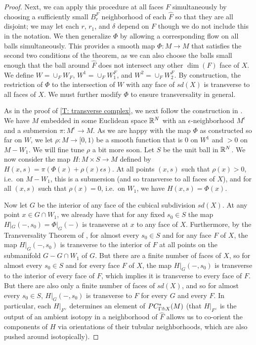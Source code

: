 \begin{proof}
	Next, we can apply this procedure at all faces $F$ simultaneously by choosing a sufficiently small $B^F_r$ neighborhood of each $\hat F$ so that they are all disjoint; we may let each $r$, $r_1$, and $\delta$ depend on $F$ though we do not include this in the notation.
	We then generalize $\Phi$ by allowing a corresponding flow on all balls simultaneously.
	This provides a smooth map $\Phi \colon M \to M$ that satisfies the second two conditions of the theorem, as we can also choose the balls small enough that the ball around $\hat F$ does not intersect any other $\dim(F)$ face of $X$.
	We define $W = \cup_F W_F$, $W^1 = \cup_F W^F_1$, and $W^2 = \cup_F W^F_2$.
	By construction, the restriction of $\Phi$ to the intersection of $W$ with any face of $sd(X)$ is transverse to all faces of $X$.
	We must further modify $\Phi$ to ensure transversality in general.

	As in the proof of \cref{T: transverse complex}, we next follow the construction in \cite[Section 2.3]{GuPo74}.
	We have $M$ embedded in some Euclidean space $\mathbb{R}^N$ with an $\epsilon$-neighborhood $M^\epsilon$ and a submersion $\pi \colon M^\epsilon \to M$.
	As we are happy with the map $\Phi$ as constructed so far on $W$, we let $\rho \colon M \to [0,1)$ be a smooth function that is $0$ on $W^1$ and $>0$ on $M-W_1$.
	We will fine tune $\rho$ a bit more soon.
	Let $S$ be the unit ball in $\mathbb{R}^N$.
	We now consider the map $H \colon M \times S \to M$ defined by $H(x,s) = \pi(\Phi(x)+\rho(x)\epsilon s)$.
	At all points $(x,s)$ such that $\rho(x)>0$, i.e.\ on $M-W_1$, this is a submersion (and so transverse to all faces of $X$), and for all $(x,s)$ such that $\rho(x) = 0$, i.e.\ on $W_1$, we have $H(x,s) = \Phi(x)$.

	Now let $G$ be the interior of any face of the cubical subdivision $sd(X)$.
	At any point $x \in G \cap W_1$, we already have that for any fixed $s_0 \in S$ the map $H|_G(-,s_0) = \Phi|_G(-)$ is transverse at $x$ to any face of $X$.
	Furthermore, by the Transversality Theorem of \cite{GuPo74}, for almost every $s_0 \in S$ and for any face $F$ of $X$, the map $H|_G(-,s_0)$ is transverse to the interior of $F$ at all points on the submanifold $G-G \cap W_1$ of $G$.
	But there are a finite number of faces of $X$, so for almost every $s_0 \in S$ and for every face $F$ of $X$, the map $H|_G(-,s_0)$ is transverse to the interior of every face of $F$, which implies it is transverse to every face of $F$.
	But there are also only a finite number of faces of $sd(X)$, and so for almost every $s_0 \in S$, $H|_G(-,s_0)$ is transverse to $F$ for every $G$ and every $F$.
	In particular, each $H|_{F^\vee}$ determines an element of $PC^*_{\Gamma \pitchfork X}(M)$ (that $H|_{F^\vee}$ is the output of an ambient isotopy in a neighborhood of $\hat F$ allows us to co-orient the components of $H$ via orientations of their tubular neighborhoods, which are also pushed around isotopically).


\end{proof}
